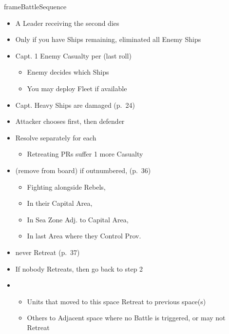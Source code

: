 \documentclass[10pt]{article}
\newlength{\fhBattleSequence} \setlength\fhBattleSequence{50\baselineskip}
\begin{document}
\begin{dynamiccontents*}{frameBattleSequence}
\begin{eubox}{\fhBattleSequence}
\begin{multicols}{2}
\begin{itemize}
			\begin{itemize}
				\item Enemy Leader gets 1\illhealth per your 2\tercios
			\end{itemize}
			\item A Leader receiving the second \illhealth dies
		\end{itemize}
		\begin{itemize}
			\item Only if you have Ships remaining,  eliminated all Enemy Ships
			\item Capt. 1 Enemy Casualty per \tercios (last roll)
			\begin{itemize}
				\item Enemy decides which Ships 
				\item You may deploy Fleet if available
			\end{itemize}
			\item Capt. Heavy Ships are damaged (p.~24)
		\end{itemize}
		\begin{itemize}
			\item Attacker chooses first, then defender
			\item Resolve separately for each 
			\begin{itemize}
				\item Retreating PRs suffer 1 more Casualty
			\end{itemize}
			\item {} (remove from board) if outnumbered,  (p.~36)
			\begin{itemize}
				\item Fighting alongside Rebels, 
				\item In their Capital Area, 
				\item In Sea Zone Adj. to Capital Area, 
				\item In last Area where they Control Prov.
			\end{itemize}
			\item {} never Retreat (p.~37)
			\item If nobody Retreats, then go back to step 2
			\item {}
			\begin{itemize}
				\item Units that moved to this space Retreat to previous space(s)
				\item Others to Adjacent space where no Battle is triggered, or may not Retreat

\end{itemize}
\end{itemize}
\end{multicols}
\end{eubox}
\end{dynamiccontents*}
\end{document}
